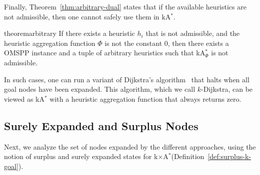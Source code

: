 \documentclass[smallextended]{svjour3}       %
\newcommand{\kD}{$k$-Dijkstra\xspace}
\newcommand{\omspp}{\ac{OMSPP}\xspace}
\newcommand{\kastar}{kA$^*$\xspace}
\newcommand{\kastarvar}[1]{\textup{kA}$^*_{#1}$\xspace}
\newcommand{\kastarmin}{\kastarvar{\min}}
\newcommand{\kastarphi}{\textup{kA}$^*_{\Phi}$\xspace}
\newcommand{\kxastar}{k$\times$A$^*$\xspace}
\newcommand{\axiomadm}{admissible\xspace}
\newcommand{\vect}[1]{\mathbf{#1}}
\newcommand{\roni}[1]{\textbf{[RS:#1]}}
\newcommand{\abda}[1]{\textbf{[AS:#1]}}
\begin{document}

Finally, Theorem~\ref{thm:arbitrary-dual} states that if the available  heuristics are not admissible, then one cannot safely use them in \kastar. 
\begin{restatable}{theorem}{arbitrary}
  \label{thm:arbitrary-dual}
  If there exists a heuristic $h_i$ that is not admissible, and the heuristic aggregation function $\Phi$ is not the constant 0, then there exists a \omspp instance and a tuple of arbitrary heuristics such that \kastarphi is not admissible.
\end{restatable}
In such cases, one can run a variant of Dijkstra's algorithm~\cite{DIJ59}
that halts when all goal nodes have been expanded. This algorithm, which we call \kD, can be viewed as \kastar with a heuristic aggregation function that always returns zero. 





\subsection{Surely Expanded and Surplus Nodes}
\label{sec:expandedStates}

Next, we analyze the set of nodes expanded by the different approaches, using the notion of surplus and surely expanded states for \kxastar (Definition~\ref{def:surplus-k-goal}). 



\end{document}
